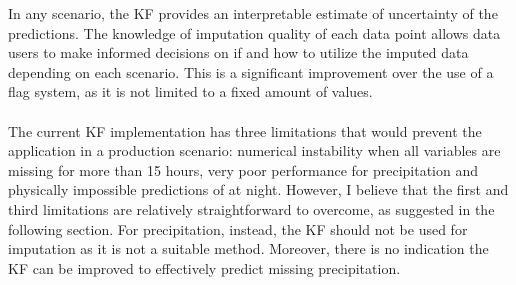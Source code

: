 \documentclass{article}
\begin{document}
In any scenario, the KF provides an interpretable estimate of uncertainty of the predictions. The knowledge of imputation quality of each data point allows data users to make informed decisions on if and how to utilize the imputed data depending on each scenario. This is a significant improvement over the use of a flag system, as it is not limited to a fixed amount of values.


\paragraph{} The current KF implementation has three limitations that would prevent the application in a production scenario: numerical instability when all variables are missing for more than 15 hours, very poor performance for precipitation and physically impossible predictions of  at night. However, I believe that the first and third limitations are relatively straightforward to overcome, as suggested in the following section. For precipitation, instead, the KF should not be used for imputation as it is not a suitable method. Moreover, there is no indication the KF can be improved to effectively predict missing precipitation.
\end{document}
